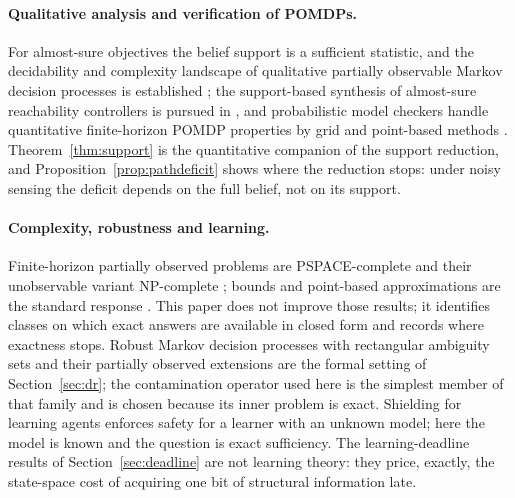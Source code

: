 \paragraph{Qualitative analysis and verification of POMDPs.}
For almost-sure objectives the belief support is a sufficient statistic, and the decidability and complexity landscape of qualitative partially observable Markov decision processes is established \cite{Chatterjee2010,Chatterjee2016}; the support-based synthesis of almost-sure reachability controllers is pursued in \cite{Junges2021}, and probabilistic model checkers handle quantitative finite-horizon POMDP properties by grid and point-based methods \cite{Norman2017,Bouton2020}. Theorem~\ref{thm:support} is the quantitative companion of the support reduction, and Proposition~\ref{prop:pathdeficit} shows where the reduction stops: under noisy sensing the deficit depends on the full belief, not on its support.

\paragraph{Complexity, robustness and learning.}
Finite-horizon partially observed problems are PSPACE-complete and their unobservable variant NP-complete \cite{PapadimitriouTsitsiklis1987}; bounds and point-based approximations are the standard response \cite{Lovejoy1991,Pineau2003}. This paper does not improve those results; it identifies classes on which exact answers are available in closed form and records where exactness stops. Robust Markov decision processes with rectangular ambiguity sets \cite{Iyengar2005,NilimElGhaoui2005} and their partially observed extensions \cite{Osogami2015,Nakao2021,Saghafian2018} are the formal setting of Section~\ref{sec:dr}; the contamination operator used here is the simplest member of that family and is chosen because its inner problem is exact. Shielding for learning agents \cite{Alshiekh2018} enforces safety for a learner with an unknown model; here the model is known and the question is exact sufficiency. The learning-deadline results of Section~\ref{sec:deadline} are not learning theory: they price, exactly, the state-space cost of acquiring one bit of structural information late.

